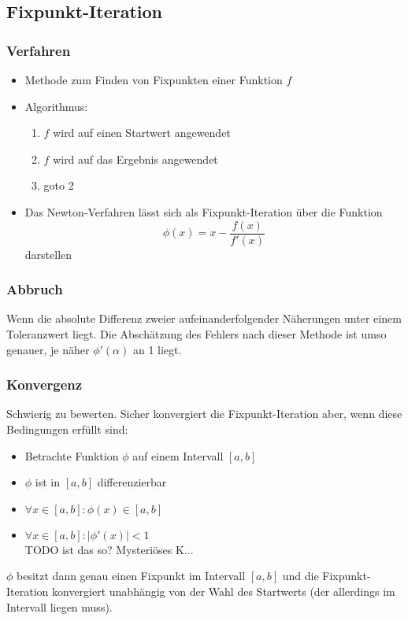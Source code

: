 \documentclass[a4paper, 12pt]{article}
\begin{document}
\subsection{Fixpunkt-Iteration}

\subsubsection*{Verfahren}
\begin{itemize}
  \item Methode zum Finden von Fixpunkten einer Funktion \(f\)
  \item Algorithmus:
    \begin{enumerate}
      \item \(f\) wird auf einen Startwert angewendet
      \item \(f\) wird auf das Ergebnis angewendet
      \item goto 2
    \end{enumerate}
  \item Das Newton-Verfahren lässt sich als Fixpunkt-Iteration über die Funktion
    \[\phi(x) = x-\frac{f(x)}{f'(x)}\]
    darstellen
\end{itemize}

\subsubsection*{Abbruch}
Wenn die absolute Differenz zweier aufeinanderfolgender Näherungen unter einem Toleranzwert liegt. Die Abschätzung des Fehlers nach dieser Methode ist umso genauer, je näher \(\phi'(\alpha)\) an 1 liegt.

\subsubsection*{Konvergenz}
Schwierig zu bewerten. Sicher konvergiert die Fixpunkt-Iteration aber, wenn diese Bedingungen erfüllt sind:
\begin{itemize}
  \item Betrachte Funktion \(\phi\) auf einem Intervall \([a,b]\)
  \item \(\phi\) ist in \([a,b]\) differenzierbar
  \item \(\forall x \in [a,b]: \phi(x) \in [a,b]\)
  \item \(\forall x \in [a,b]: |\phi'(x)|<1\)\\
    TODO ist das so? Mysteriöses K...
\end{itemize}
\(\phi\) besitzt dann genau einen Fixpunkt im Intervall \([a,b]\) und die Fixpunkt-Iteration konvergiert unabhängig von der Wahl des Startwerts (der allerdings im Intervall liegen muss).
\end{document}
